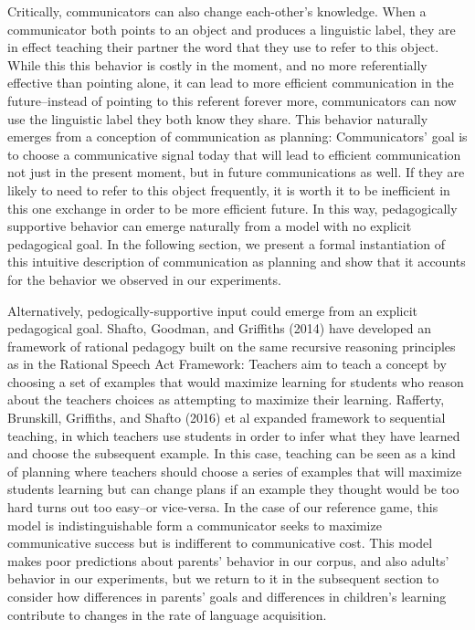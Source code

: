 \documentclass[english,,man,floatsintext]{apa6}
\begin{document}
Critically, communicators can also change each-other's knowledge. When a communicator both points to an object and produces a linguistic label, they are in effect teaching their partner the word that they use to refer to this object. While this this behavior is costly in the moment, and no more referentially effective than pointing alone, it can lead to more efficient communication in the future--instead of pointing to this referent forever more, communicators can now use the linguistic label they both know they share. This behavior naturally emerges from a conception of communication as planning: Communicators' goal is to choose a communicative signal today that will lead to efficient communication not just in the present moment, but in future communications as well. If they are likely to need to refer to this object frequently, it is worth it to be inefficient in this one exchange in order to be more efficient future. In this way, pedagogically supportive behavior can emerge naturally from a model with no explicit pedagogical goal. In the following section, we present a formal instantiation of this intuitive description of communication as planning and show that it accounts for the behavior we observed in our experiments.

Alternatively, pedogically-supportive input could emerge from an explicit pedagogical goal. Shafto, Goodman, and Griffiths (2014) have developed an framework of rational pedagogy built on the same recursive reasoning principles as in the Rational Speech Act Framework: Teachers aim to teach a concept by choosing a set of examples that would maximize learning for students who reason about the teachers choices as attempting to maximize their learning. Rafferty, Brunskill, Griffiths, and Shafto (2016) et al expanded framework to sequential teaching, in which teachers use students in order to infer what they have learned and choose the subsequent example. In this case, teaching can be seen as a kind of planning where teachers should choose a series of examples that will maximize students learning but can change plans if an example they thought would be too hard turns out too easy--or vice-versa. In the case of our reference game, this model is indistinguishable form a communicator seeks to maximize communicative success but is indifferent to communicative cost. This model makes poor predictions about parents' behavior in our corpus, and also adults' behavior in our experiments, but we return to it in the subsequent section to consider how differences in parents' goals and differences in children's learning contribute to changes in the rate of language acquisition.
\end{document}
